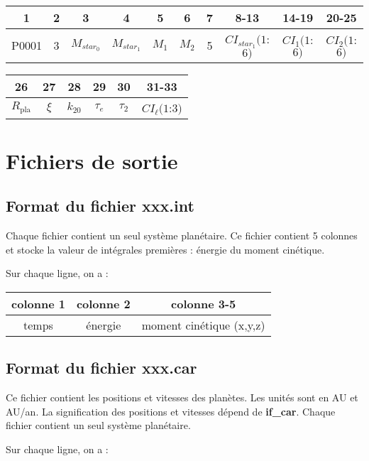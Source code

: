 \documentclass[11pt]{article}
\begin{document}
\begin{tabular}{|c|c|c|c|c|c|c|c|c|c|} \hline
1 &  2 &  3 & 4 & 5 &6 &7 &8-13 &14-19 &20-25 \\ \hline
P0001 & 3 & $M_{star_0}$  & $M_{star_1}$ &  $M_1$ & $M_2$  &5 &$CI_{star_1}(1$:$6)$ & $CI_1(1$:$6)$&$CI_2(1$:$6)$
\\    \hline
\end{tabular}

\begin{tabular}{|c|c|c|c|c|c|} \hline
26 &27 &28 &29 &30 &31-33\\ \hline
$R_\mathrm{pla}$ &$\xi$ &$k_{20}$ &$\tau_e$ &$\tau_2$ &$CI_{\ell}(1$:$3)$\\    \hline
\end{tabular}

\section{Fichiers de sortie}

\subsection{Format du fichier {\bf xxx.int} }

Chaque fichier contient un seul syst\`eme plan\'etaire.
Ce fichier contient 5 colonnes et stocke la valeur de int\'egrales premi\`eres  : \'energie du moment cin\'etique.

Sur chaque ligne, on a : 

\begin{tabular}{|c|c|c|} \hline
colonne 1 &  colonne 2 & colonne 3-5 \\ \hline
temps & \'energie & moment cin\'etique (x,y,z)\\    \hline
\end{tabular}


\subsection{Format du fichier {\bf xxx.car} }

Ce fichier contient les positions et vitesses des plan\`etes. Les unit\'es sont en AU et AU/an.
La signification des positions et vitesses d\'epend de  {\bf if\_car}.
Chaque fichier contient un seul syst\`eme plan\'etaire.

Sur chaque ligne, on a : 
\end{document}
